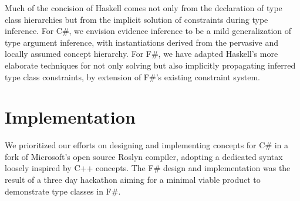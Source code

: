 \documentclass[preprint]{sig-alternate-05-2015}
\begin{document}
Much of the concision of Haskell comes not only from the declaration of type class hierarchies but from the implicit solution of constraints during type inference.
For C\#, we envision evidence inference to be a mild generalization of type argument inference, with instantiations derived from the pervasive and locally assumed concept hierarchy.
For F\#, we have adapted Haskell's more elaborate techniques for not only solving but also implicitly propagating inferred type class constraints, by extension of F\#'s existing constraint system.
\section{Implementation}

We prioritized our efforts on designing and implementing concepts for C\# in a fork\cite{Roslynfork}  of  Microsoft's open source Roslyn compiler\cite{Roslyn}, adopting a dedicated syntax loosely inspired  by C++ concepts\cite{cppconcepts}.
The F\# design and implementation was the result of a three day hackathon aiming for a minimal viable product to demonstrate type classes in F\#.


 
\end{document}
